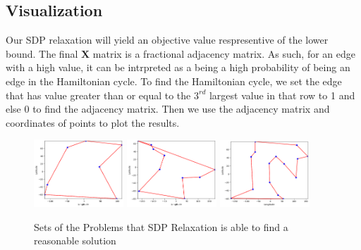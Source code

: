 \documentclass{article}
\begin{document}
\subsection{Visualization}
Our SDP relaxation will yield an objective value respresentive of the lower bound. 
The final $\mathbf{X}$ matrix is a fractional adjacency matrix. As such, for an edge with a high value,
it can be intrpreted as a being a high probability of being an edge in the Hamiltonian cycle.
To find the Hamiltonian cycle, we set the edge that has value greater   than or equal to the $3^{rd}$ largest value in that row to 1 and else 0 to find the adjacency matrix.
Then we use the adjacency matrix and coordinates of points to plot the results.
\begin{figure}[!ht]
    \centering
    \includegraphics[width=0.3\textwidth]{assets/tsp7.png}
    \includegraphics[width=0.3\textwidth]{assets/tsp-10.png}
    \includegraphics[width=0.3\textwidth]{assets/tsp-15-works.png}
    \caption{Sets of the Problems that SDP Relaxation is able to find a reasonable solution}
    \label{fig:TSP Graph}
\end{figure}
\end{document}
